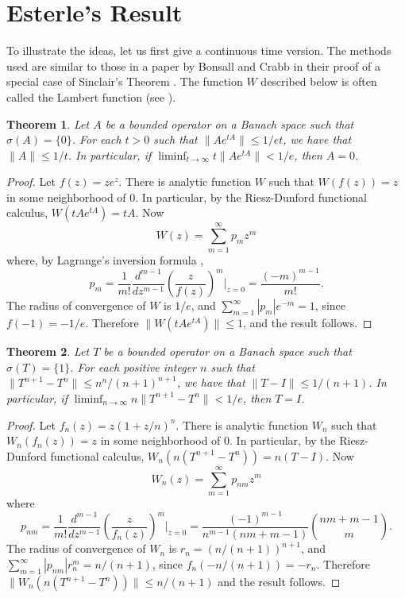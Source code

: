 \documentclass[12pt]{amsart}
\newtheorem{thm}{Theorem}[section]
\newcommand{\modo}[1]{{\left|#1\right|}}
\newcommand{\snormo}[1]{{\mathopen\|#1\mathclose\|}}
\begin{document}
\section{Esterle's Result}

To illustrate the ideas, let us first give a
continuous time version.
The methods used are similar to those in a paper by
Bonsall and Crabb \cite{bonsall-crabb} in their proof of a special case of
Sinclair's Theorem \cite{sinclair}.
The function $W$ described below is often called
the Lambert function (see \cite{corless et al}).

\begin{thm}
\label{esterle continuous}
Let $A$ be a bounded operator on a Banach space such that
$\sigma(A) = \{0\}$.  For each $t>0$ such that
$\snormo{A e^{tA}} \le 1/et$, we have that $\snormo{A} \le 1/t$.
In particular, if
$\liminf_{t\to\infty} t \snormo{Ae^{tA}} < 1/e$,
then $A = 0$.
\end{thm}

\begin{proof}
Let $f(z) = z e^z$.
There is analytic function $W$ such that
$W(f(z)) = z$ in some neighborhood of $0$.  In particular,
by the Riesz-Dunford functional calculus,
$W(tA e^{tA}) = tA$.
Now
$$ W(z) = \sum_{m=1}^\infty p_{m} z^m $$
where, by Lagrange's inversion formula \cite[Ch.~5, Ex.~33]{asmar},
$$ p_{m} = \frac1{m!}\frac{d^{m-1}}{dz^{m-1}} \left(\frac z{f(z)}\right)^m
            \Bigg |_{z=0}
          = \frac{(-m)^{m-1}}{m!} .$$
The radius of convergence of $W$ is $1/e$, and
$ \sum_{m=1}^\infty \modo{p_{m}} e^{-m} = 1 $,
since $f(-1) = -1/e$.
Therefore
$\snormo{W(tA e^{tA})} \le 1$, and the result follows.
\end{proof}

\begin{thm}
\label{esterle}
Let $T$ be a bounded operator on a Banach space such that
$\sigma(T) = \{1\}$.  For each positive integer $n$ such that
$\snormo{T^{n+1}-T^n} \le n^n/(n+1)^{n+1}$, we have that
$\snormo{T-I} \le 1/(n+1)$.  In particular, if
$\liminf_{n\to\infty} n \snormo{T^{n+1}-T^n} < 1/e$,
then $T = I$.
\end{thm}

\begin{proof}
Let $f_n(z) = z(1+z/n)^n$.
There is analytic function $W_n$ such that
$W_n(f_n(z)) = z$ in some neighborhood of $0$.  In particular,
by the Riesz-Dunford functional calculus,
$W_n(n(T^{n+1}-T^n)) = n(T-I)$.
Now
$$ W_n(z) = \sum_{m=1}^\infty p_{nm} z^m $$
where
$$ p_{nm} = \frac1{m!}\frac{d^{m-1}}{dz^{m-1}} \left(\frac z{f_n(z)}\right)^m
            \Bigg |_{z=0}
          = \frac{(-1)^{m-1}}{n^{m-1} (nm+m-1)}
            \binom{nm+m-1}m .$$
The radius of convergence of $W_n$ is $r_n = (n/(n+1))^{n+1}$, and
$\sum_{m=1}^\infty \modo{p_{nm}} r_n^m = n/(n+1)$,
since $f_n(-n/(n+1)) = -r_n$.
Therefore
$\snormo{W_n(n(T^{n+1}-T^n))} \le n/(n+1)$
and the result follows.
\end{proof}
\end{document}
